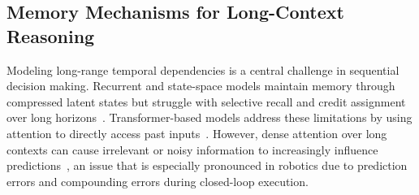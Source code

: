 
\subsection{Memory Mechanisms for Long-Context Reasoning}
Modeling long-range temporal dependencies is a central challenge in sequential decision making. 
Recurrent and state-space models maintain memory through compressed latent states but struggle with selective recall and credit assignment over long horizons~\cite{lstm, mamba, bengio1993credit}.
Transformer-based models address these limitations by using attention to directly access past inputs~\cite{vaswani2017attention}.
However, dense attention over long contexts can cause irrelevant or noisy information to increasingly influence predictions~\cite{hong2025context}, an issue that is especially pronounced in robotics due to prediction errors and compounding errors during closed-loop execution.

